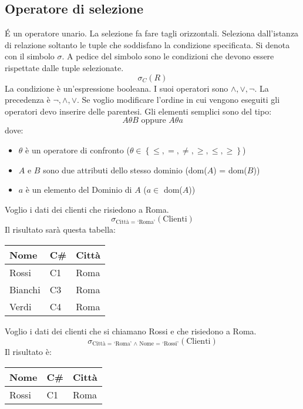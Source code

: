 \subsection{Operatore di selezione}

\'E un operatore unario. La selezione fa fare tagli orizzontali. Seleziona dall'istanza di relazione soltanto le tuple che soddisfano la condizione specificata. Si denota con il simbolo $\sigma$. A pedice del simbolo sono le condizioni che devono essere rispettate dalle tuple selezionate.
\[
\sigma_{C}(R)
\]
La condizione \`e un'espressione booleana. I suoi operatori sono $\land, \lor, \neg$. La precedenza \`e $\neg, \land, \lor$. Se voglio modificare l'ordine in cui vengono eseguiti gli operatori devo inserire delle parentesi. Gli elementi semplici sono del tipo:
\[
A \theta B
\text{ oppure }
A \theta a
\]
dove:
\begin{itemize}
    \item $\theta$ \`e un operatore di confronto ($\theta \in \left\{  \le, =, \neq, \ge, \leq, \geq \right\}$)
    \item $A$ e $B$ sono due attributi dello stesso dominio (dom($A$) = dom($B$))
    \item $a$ \`e un elemento del Dominio di $A$ ($a \in$ dom($A$))
\end{itemize}

Voglio i dati dei clienti che risiedono a Roma.
\[
\sigma_{\text{Citt\`a = `Roma'}}(\text{Clienti})
\]
Il risultato sar\`a questa tabella:

\begin{center}
\begin{tabular}{lll}
Nome & C\# & Citt\`a \\
\hline
Rossi & C1 & Roma \\
Bianchi & C3 & Roma \\
Verdi & C4 & Roma
\end{tabular}
\end{center}

Voglio i dati dei clienti che si chiamano Rossi e che risiedono a Roma.
\[
\sigma_{\text{Citt\`a = `Roma' } \land \text{ Nome = `Rossi'}}(\text{Clienti})
\]
Il risultato \`e:

\begin{center}
\begin{tabular}{lll}
Nome & C\# & Citt\`a \\
\hline
Rossi & C1 & Roma
\end{tabular}
\end{center}

